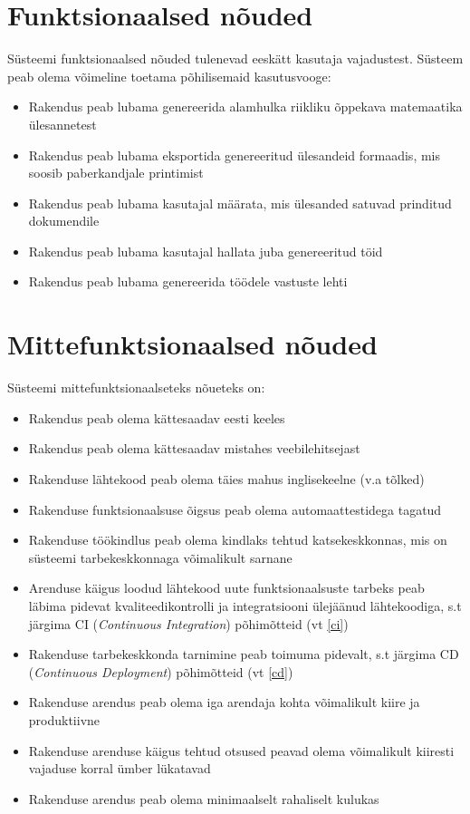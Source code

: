 \section{Funktsionaalsed nõuded}

Süsteemi funktsionaalsed nõuded tulenevad eeskätt kasutaja vajadustest. Süsteem peab olema võimeline toetama põhilisemaid kasutusvooge:

\begin{itemize}
  \item Rakendus peab lubama genereerida alamhulka riikliku õppekava matemaatika ülesannetest
  \item Rakendus peab lubama eksportida genereeritud ülesandeid formaadis, mis soosib paberkandjale printimist
  \item Rakendus peab lubama kasutajal määrata, mis ülesanded satuvad prinditud dokumendile
  \item Rakendus peab lubama kasutajal hallata juba genereeritud töid
  \item Rakendus peab lubama genereerida töödele vastuste lehti
\end{itemize}

\section{Mittefunktsionaalsed nõuded}

Süsteemi mittefunktsionaalseteks nõueteks on:

\begin{itemize}
  \item Rakendus peab olema kättesaadav eesti keeles
  \item Rakendus peab olema kättesaadav mistahes veebilehitsejast
  \item Rakenduse lähtekood peab olema täies mahus inglisekeelne (v.a tõlked)
  \item Rakenduse funktsionaalsuse õigsus peab olema automaattestidega tagatud
  \item Rakenduse töökindlus peab olema kindlaks tehtud katsekeskkonnas, mis on süsteemi tarbekeskkonnaga võimalikult sarnane
  \item Arenduse käigus loodud lähtekood uute funktsionaalsuste tarbeks peab läbima pidevat kvaliteedikontrolli ja integratsiooni ülejäänud lähtekoodiga, s.t järgima CI (\textit{Continuous Integration}) põhimõtteid (vt \ref{ci})
  \item Rakenduse tarbekeskkonda tarnimine peab toimuma pidevalt, s.t järgima CD (\textit{Continuous Deployment}) põhimõtteid (vt \ref{cd})
  \item Rakenduse arendus peab olema iga arendaja kohta võimalikult kiire ja produktiivne
  \item Rakenduse arenduse käigus tehtud otsused peavad olema võimalikult kiiresti vajaduse korral ümber lükatavad
  \item Rakenduse arendus peab olema minimaalselt rahaliselt kulukas
\end{itemize}


